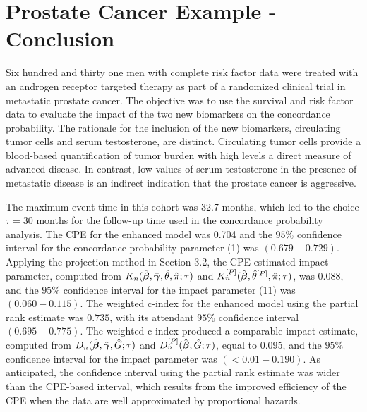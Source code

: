 \documentclass[12pt]{article}
\newcommand{\bg}{\mbox{\boldmath $\gamma$}}
\newcommand{\bb}{\mbox{\boldmath $\beta$}}
\begin{document}
\vskip 0.50in

\section{Prostate Cancer Example - Conclusion} 

Six hundred and thirty one men with complete risk factor data were treated with an androgen receptor targeted therapy as part of a randomized clinical trial in metastatic prostate cancer. The objective was to use the survival and risk factor data to evaluate the impact of the two new biomarkers on the concordance probability. The rationale for the inclusion of the new biomarkers, circulating tumor cells and serum testosterone, are distinct.  Circulating tumor cells provide a blood-based quantification of tumor burden with high levels a direct measure of advanced disease.  In contrast, low values of serum testosterone in the presence of metastatic disease is an indirect indication that the prostate cancer is aggressive.
 
The maximum event time in this cohort was 32.7 months, which led to the choice $\tau = 30$ months for the follow-up time used in the concordance probability analysis. The CPE for the enhanced model was 0.704 and the $95\%$ confidence interval for the concordance probability parameter (1) was $(0.679-0.729)$. Applying the projection method in Section 3.2, the CPE estimated impact parameter, computed from $K_n(\hat{\bb},\hat{\bg},\hat{\theta}, \hat{\pi}; \tau)$ and  $K_n^{[P]}(\hat{\bb}, \hat{\theta}^{[P]},\hat{\pi} ; \tau)$, was 0.088, and the $95\%$ confidence interval for the impact parameter (11) was $(0.060-0.115)$. 
The weighted c-index for the enhanced model using the partial rank estimate was $0.735$, with its attendant $95\%$ confidence interval $(0.695-0.775)$.  
The weighted c-index produced a comparable impact estimate, computed from $D_n(\hat{\bb},\hat{\bg}, \hat{G}; \tau)$ and $D_n^{[P]}(\hat{\bb}, \hat{G} ; \tau)$, equal to 0.095, and the $95\%$ confidence interval for the impact parameter was $(<0.01-0.190)$. As anticipated, the confidence interval using the partial rank estimate was wider than the CPE-based interval, which results from the improved efficiency of the CPE when the data are well approximated by proportional hazards. 
\end{document}
